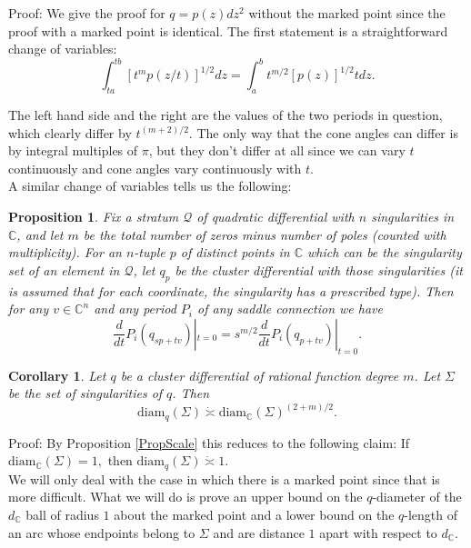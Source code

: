 \documentclass[12pt]{article}
\newtheorem{proposition}[theorem]{Proposition}
\newtheorem{corollary}[theorem]{Corollary}
\newcommand{\cc}{\mathbb{C}}
\newcommand{\diam}{\mathrm{diam}}
\begin{document}
\noindent Proof: We give the proof for $q = p(z)dz^2$ without the marked point since the proof with a marked point is identical. The first statement is a straightforward change of variables: $$\int_{ta}^{tb} [t^mp(z/t)]^{1/2} dz = \int_a^b t^{m/2}[p(z)]^{1/2} t dz.$$

\noindent The left hand side and the right are the values of the two periods in question, which clearly differ by $t^{(m+2)/2}$. The only way that the cone angles can differ is by integral multiples of $\pi$, but they don't differ at all since we can vary $t$ continuously and cone angles vary continuously with $t$.\\

\noindent A similar change of variables tells us the following:

\begin{proposition}\label{PropDerivScale}Fix a stratum $\mathcal{Q}$ of quadratic differential with $n$ singularities in $\cc$, and let $m$ be the total number of zeros minus number of poles (counted with multiplicity). For an $n$-tuple $p$ of distinct points in $\cc$ which can be the singularity set of an element in $\mathcal{Q}$, let $q_p$ be the cluster differential with those singularities (it is assumed that for each coordinate, the singularity has a prescribed type). Then for any  $v \in \cc^n$ and any period $P_i$ of any saddle connection we have $$\frac{d}{dt}P_i(q_{sp + tv})|_{t = 0} = s^{m/2}\frac{d}{dt}P_i(q_{p + tv})|_{t = 0}.$$\end{proposition}

\begin{corollary}\label{CoroClusterSizes}Let $q$ be a cluster differential of rational function degree $m$. Let $\Sigma$ be the set of singularities of $q$. Then $$\diam_q(\Sigma) \dot{\asymp} \diam_\cc(\Sigma)^{(2 + m)/2}.$$ \end{corollary}

\noindent Proof: By Proposition \ref{PropScale} this reduces to the following claim: If $\diam_{\cc}(\Sigma) = 1,$ then $\diam_{q}(\Sigma) \dot{\asymp} 1$.\\

\noindent We will only deal with the case in which there is a marked point since that is more difficult. What we will do is prove an upper bound on the $q$-diameter of the $d_\cc$ ball of radius $1$ about the marked point and a lower bound on the $q$-length of an arc whose endpoints belong to $\Sigma$ and are distance $1$ apart with respect to $d_\cc$.\\
\end{document}

